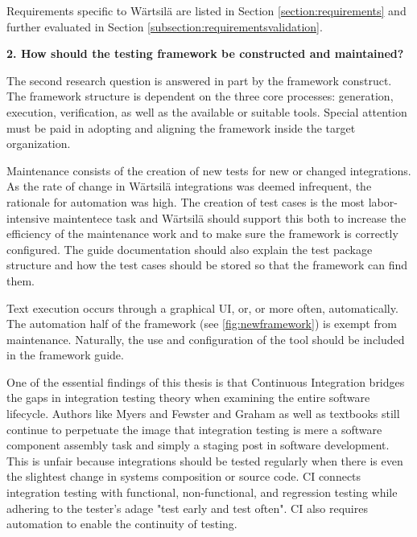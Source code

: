 \documentclass[12pt,a4paper,oneside,pdftex]{report}
\begin{document}
{Requirements specific to Wärtsilä are listed in Section \ref{section:requirements} and further evaluated in Section \ref{subsection:requirementsvalidation}. \\

\begin{adjustwidth}{2.5em}{0pt}
\textbf{2. How should the testing framework be constructed and maintained?} \\
\end{adjustwidth}

The second research question is answered in part by the framework construct. The framework structure is dependent on the three core processes: generation, execution, verification, as well as the available or suitable tools. Special attention must be paid in adopting and aligning the framework inside the target organization.

Maintenance consists of the creation of new tests for new or changed integrations. As the rate of change in Wärtsilä integrations was deemed infrequent, the rationale for automation was high. The creation of test cases is the most labor-intensive maintentece task and Wärtsilä should support this both to increase the efficiency of the maintenance work and to make sure the framework is correctly configured. The guide documentation should also explain the test package structure and how the test cases should be stored so that the framework can find them.

Text execution occurs through a graphical UI, or, or more often, automatically. The automation half of the framework (see \ref{fig:newframework}) is exempt from maintenance. Naturally, the use and configuration of the tool should be included in the framework guide.

One of the essential findings of this thesis is that Continuous Integration bridges the gaps in integration testing theory when examining the entire software lifecycle. Authors like Myers and Fewster and Graham as well as textbooks \citep{burnstein2003practical} still continue to perpetuate the image that integration testing is mere a software component assembly task and simply a staging post in software development. This is unfair because integrations should be tested regularly when there is even the slightest change in systems composition or source code. CI connects integration testing with functional, non-functional, and regression testing while adhering to the tester's adage "test early and test often". CI also requires automation to enable the continuity of testing.

}
\end{document}

